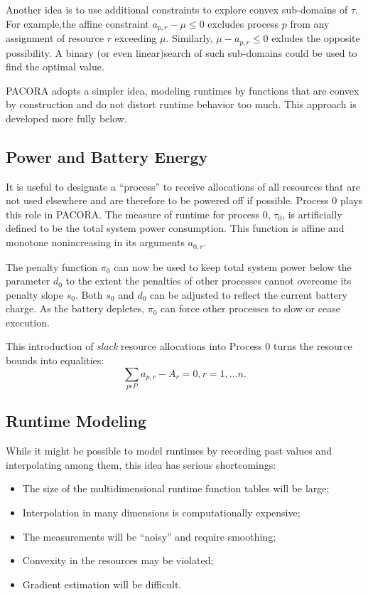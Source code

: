 Another idea is to use additional constraints to explore convex sub-domains of $\tau$.
For example,the affine constraint $a_{p,r} - \mu \leq 0$ excludes process $p$ from any assignment of resource $r$ exceeding $\mu$.  Similarly, $\mu - a_{p,r} \leq 0$ exludes the opposite possibility.
A binary (or even linear)search of such sub-domains could be used to find the optimal value.

PACORA adopts a simpler idea, modeling runtimes by functions that are convex by construction
and do not distort runtime behavior too much.  This approach is developed more fully below.

\subsection*{Power and Battery Energy}

It is useful to designate a ``process'' to receive allocations of all resources
that are not used elsewhere and are therefore to be powered off if possible.
Process 0 plays this role in PACORA.
The measure of runtime for process 0, $\tau_0$,
is artificially defined to be the total system power consumption.
This function is affine and monotone nonincreasing in its arguments $a_{0,r}$.

The penalty function $\pi_0$ can now be used to keep total system power below the parameter $d_0$
to the extent the penalties of other processes cannot overcome its penalty slope $s_0$.
Both $s_0$ and $d_0$ can be adjusted to reflect the current battery charge.
As the battery depletes, $\pi_0$ can force other processes to slow or cease execution.

This introduction of \emph{slack} resource allocations into Process 0 turns the resource bounds into equalities:
\begin{displaymath}
\sum_{p\epsilon P} a_{p,r} - A_r = 0, r = 1,\dots n.
\end{displaymath}

\subsection*{Runtime Modeling}

While it might be possible to model runtimes by recording past values and interpolating among them,
this idea has serious shortcomings:
\begin{itemize}
\item The size of the multidimensional runtime function tables will be large;
\item Interpolation in many dimensions is computationally expensive;
\item The measurements will be “noisy” and require smoothing;
\item Convexity in the resources may be violated;
\item Gradient estimation will be difficult.
\end{itemize}

